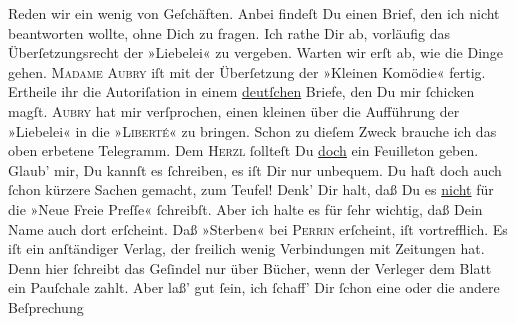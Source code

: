 \pstart
           Reden wir ein wenig von Geſchäften. Anbei findeſt Du einen Brief, den ich nicht
               beantworten wollte, ohne Dich zu fragen. Ich rathe Dir ab, vorläufig das
               Überſetzungsrecht der »Liebelei« zu vergeben.
               Warten wir erſt ab, wie die Dinge gehen. \textsc{Madame Aubry} iſt mit der Überſetzung
               der {\pb}»Kleinen
                  Komödie« fertig. Ertheile ihr die Autoriſation in einem \uline{deutſchen} Briefe, den Du mir ſchicken magſt. \textsc{Aubry} hat mir verſprochen, einen kleinen \label{K_L02750-3v}\label{K_L02750-3} über die Aufführung der »Liebelei« in die »\textsc{Liberté}« zu bringen. Schon zu dieſem Zweck brauche ich das oben erbetene Telegramm. Dem
                  \textsc{Herzl} ſollteſt Du \uline{doch} ein Feuilleton geben. Glaub’
               mir, Du kannſt es ſchreiben, es iſt Dir nur unbequem. {\pb}Du haſt doch auch ſchon kürzere Sachen gemacht, zum
               Teufel! Denk’ Dir halt, daß Du es \uline{nicht} für die »Neue Freie Preſſe« ſchreibſt. Aber ich halte es
               für ſehr wichtig, daß Dein Name auch dort erſcheint. Daß »Sterben« bei \textsc{Perrin} erſcheint, iſt vortrefflich. Es iſt ein anſtändiger Verlag, der ſreilich wenig Verbindungen mit
               Zeitungen hat. Denn hier ſchreibt das Geſindel nur über {\pb}Bücher, wenn der Verleger dem Blatt ein Pauſchale
               zahlt. Aber laß’ gut ſein, ich  ſchaff’ Dir
               ſchon eine oder die andere Beſprechung{\dotssix}\pend
           
